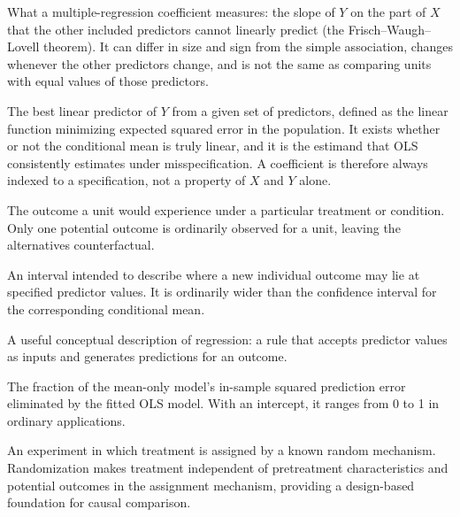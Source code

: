 \documentclass[11pt]{report}
\begin{document}
\begin{description}[style=nextline,leftmargin=0pt,labelindent=0pt,font=\bfseries]
\item[Partial association] What a multiple-regression coefficient measures: the slope of \(Y\) on the part of \(X\) that the other included predictors cannot linearly predict (the Frisch--Waugh--Lovell theorem). It can differ in size and sign from the simple association, changes whenever the other predictors change, and is not the same as comparing units with equal values of those predictors.

\item[Population linear projection] The best linear predictor of \(Y\) from a given set of predictors, defined as the linear function minimizing expected squared error in the population. It exists whether or not the conditional mean is truly linear, and it is the estimand that OLS consistently estimates under misspecification. A coefficient is therefore always indexed to a specification, not a property of \(X\) and \(Y\) alone.

\item[Potential outcome] The outcome a unit would experience under a particular treatment or condition. Only one potential outcome is ordinarily observed for a unit, leaving the alternatives counterfactual.

\item[Prediction interval] An interval intended to describe where a new individual outcome may lie at specified predictor values. It is ordinarily wider than the confidence interval for the corresponding conditional mean.

\item[Prediction machine] A useful conceptual description of regression: a rule that accepts predictor values as inputs and generates predictions for an outcome.

\item[\(R^2\)] The fraction of the mean-only model's in-sample squared prediction error eliminated by the fitted OLS model. With an intercept, it ranges from 0 to 1 in ordinary applications.

\item[Randomized controlled trial (RCT)] An experiment in which treatment is assigned by a known random mechanism. Randomization makes treatment independent of pretreatment characteristics and potential outcomes in the assignment mechanism, providing a design-based foundation for causal comparison.


\end{description}
\end{document}
